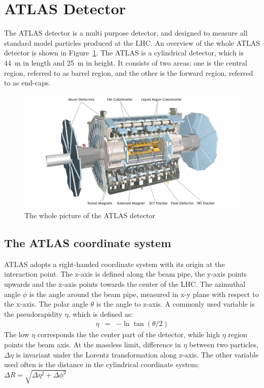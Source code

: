 \section{ATLAS Detector}
\label{sec:detector}
The ATLAS detector is a multi purpose detector, and designed to measure all standard model particles produced at the LHC.
An overview of the whole ATLAS detector is shown in Figure~\ref{fig:ATLAS}.
The ATLAS is a cylindrical detector, which is 44~m in length and 25~m in height. It consists of two areas; one is the central region, referred to as barrel region, and the other is the forward region, referred to as end-caps.
\begin{figure}[tbp]
\begin{center}
 \includegraphics[width=1.0\textwidth,keepaspectratio]{figures/detector/ATLAS}
\caption{
The whole picture of the ATLAS detector
}
\label{fig:ATLAS}
\end{center}
\end{figure}

\subsection{The ATLAS coordinate system}
ATLAS adopts a right-handed coordinate system with its origin at the interaction point. The z-axis is defined along the beam pipe, the y-axis points upwards and the x-axis points towards the center of the LHC. The azimuthal angle $\phi$ is the angle around the beam pipe, measured in x-y plane with respect to the x-axis. The polar angle $\theta$ is the angle to z-axis. A commonly used variable is the pseudorapidity $\eta$, which is defined as:
\begin{eqnarray*}
\eta &=& -\ln\tan(\theta/2)
\end{eqnarray*}
The low $\eta$ corresponds the the center part of the detector, while high $\eta$ region points the beam axis. At the massless limit, difference in $\eta$ between two particles, $\Delta\eta$ is invariant under the Lorentz transformation along z-axis.
The other variable used often is the distance in the cylindrical coordinate system;
$
\Delta R = \sqrt{\Delta \eta^2 + \Delta \phi^2}
$


